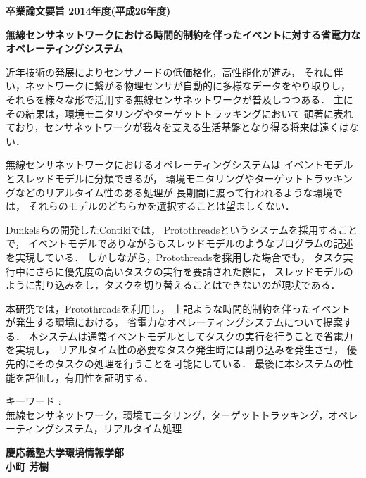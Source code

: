 \begin{center}
\textbf{\Large 卒業論文要旨 2014年度(平成26年度)}

\vspace{6.18mm}

\textbf{\Large 無線センサネットワークにおける時間的制約を伴ったイベントに対する省電力なオペレーティングシステム}
\end{center}

\vspace{10mm}
近年技術の発展によりセンサノードの低価格化，高性能化が進み，
それに伴い，ネットワークに繋がる物理センサが自動的に多様なデータをやり取りし，
それらを様々な形で活用する無線センサネットワークが普及しつつある．
主にその結果は，環境モニタリングやターゲットトラッキングにおいて
顕著に表れており，センサネットワークが我々を支える生活基盤となり得る将来は遠くはない．

無線センサネットワークにおけるオペレーティングシステムは
イベントモデルとスレッドモデルに分類できるが，
環境モニタリングやターゲットトラッキングなどのリアルタイム性のある処理が
長期間に渡って行われるような環境では，
それらのモデルのどちらかを選択することは望ましくない．

Dunkelsらの開発したContikiでは，
Protothreadsというシステムを採用することで，
イベントモデルでありながらもスレッドモデルのようなプログラムの記述を実現している．
しかしながら，Protothreadsを採用した場合でも，
タスク実行中にさらに優先度の高いタスクの実行を要請された際に，
スレッドモデルのように割り込みをし，タスクを切り替えることはできないのが現状である．

本研究では，Protothreadsを利用し，
上記ような時間的制約を伴ったイベントが発生する環境における，
省電力なオペレーティングシステムについて提案する．
本システムは通常イベントモデルとしてタスクの実行を行うことで省電力を実現し，
リアルタイム性の必要なタスク発生時には割り込みを発生させ，
優先的にそのタスクの処理を行うことを可能にしている．
最後に本システムの性能を評価し，有用性を証明する．


\vspace{10mm}
キーワード :\\
\hspace{3.5em}無線センサネットワーク，環境モニタリング，ターゲットトラッキング，オペレーティングシステム，リアルタイム処理

\begin{flushright}
\textbf{慶応義塾大学環境情報学部}\\
\textbf{小町 芳樹}
\end{flushright}

